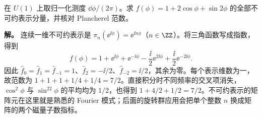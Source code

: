 \begin{example}[圆群上的展开与范数]
在 $U(1)$ 上取归一化测度 $\dd\phi/(2\pi)$。求 $f(\phi)=1+2\cos\phi+\sin2\phi$ 的全部不可约表示分量，并核对 Plancherel 范数。

\textbf{解。} 连续一维不可约表示是 $\pi_n(\ee^{\ii\phi})=\ee^{\ii n\phi}$（$n\in\ZZ$）。将三角函数写成指数，得到
\[
f(\phi)=1+\ee^{\ii\phi}+\ee^{-\ii\phi}
-\frac{\ii}{2}\ee^{2\ii\phi}+\frac{\ii}{2}\ee^{-2\ii\phi}.
\]
因此 $\widehat f_0=\widehat f_{1}=\widehat f_{-1}=1$、$\widehat f_2=-\ii/2$、$\widehat f_{-2}=\ii/2$，其余为零。每个表示维数为一，故范数为 $1+1+1+1/4+1/4=7/2$。直接积分时不同频率的交叉项消失，$\cos^2\phi$ 与 $\sin^22\phi$ 的平均均为 $1/2$，也得到 $1+4/2+1/2=7/2$。不可约表示的矩阵元在这里就是熟悉的 Fourier 模式；后面的旋转群应用会把单个整数 $n$ 换成矩阵的两个磁量子数指标。
\end{example}
